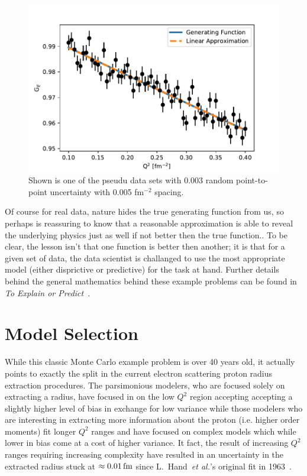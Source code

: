 \documentclass[10pt,aps,prc,twocolumn]{revtex4-1}
\begin{document}
\begin{figure}[htb]
\includegraphics[width=\columnwidth]{Figure/linearVStrue.pdf}
\caption{Shown is one of the pseudu data sets with 0.003 random point-to-point uncertainty with 0.005 fm$^{-2}$ spacing.}
\end{figure}

Of course for real data, nature hides the true generating function from us, so perhaps is reassuring to know
that a reasonable approximation is able to reveal the underlying physics just as well if not better then the
true function..   
To be clear, the lesson isn't that one function is better then another; it is that for a given set of data,
the data scientist is challanged to use the most appropriate model (either disprictive or predictive) for
the task at hand.   Further details behind the general mathematics behind these example problems can be 
found in {\it{To Explain or Predict}}~\cite{Shmueli:2010}.    


\section{Model Selection}

While this classic Monte Carlo example problem is over 40 years old, it actually points to exactly the split in 
the current electron scattering proton radius extraction procedures.     The parsimonious modelers, who are 
focused solely on extracting a radius, have focused in on the low $Q^2$ region accepting accepting a slightly higher 
level of bias in exchange for low variance while those modelers who are interesting in extracting more information 
about the proton (i.e. higher order moments) fit longer $Q^2$ ranges and have
focused on complex models which while lower in bias come at a cost of higher variance.  
It fact, the result of increasing $Q^2$ ranges requiring increasing complexity have resulted in
an uncertainty in the extracted radius 
stuck at $\approx \unit[0.01]{fm}$ since L.~Hand~\textit{et al.}'s original fit in 1963~\cite{Hand:1963zz}.
\end{document}
